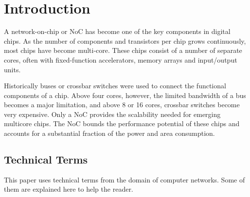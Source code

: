 
\newcommand{\docTitle}{Spidergon Network-on-Chip}
\newcommand{\docAuthor}{Andrew Fecheyr Lippens}
\newcommand{\docDate}{\today}
\newcommand{\docSubject}{Redes en Chip}







\begin{abstract}
\end{abstract}

\setcounter{tocdepth}{2}
\begin{tableofcontents}
\end{tableofcontents}

\newpage

\section{Introduction}\label{C:intro}
	
	A network-on-chip or NoC has become one of the key components in digital chips. As the number of components and transistors per chip grows continuously, most chips have become multi-core. These chips consist of a number of separate cores, often with fixed-function accelerators, memory arrays and input/output units.
		
	Historically buses or crossbar switches were used to connect the functional components of a chip. Above four cores, however, the limited bandwidth of a bus becomes a major limitation, and above 8 or 16 cores, crossbar switches become very expensive. Only a NoC provides the scalability needed for emerging multicore chips. The NoC bounds the performance potential of these chips and accounts for a substantial fraction of the power and area consumption.

\subsection{Technical Terms}\label{S:terms}
	This paper uses technical terms from the domain of computer networks. Some of them are explained here to help the reader.

